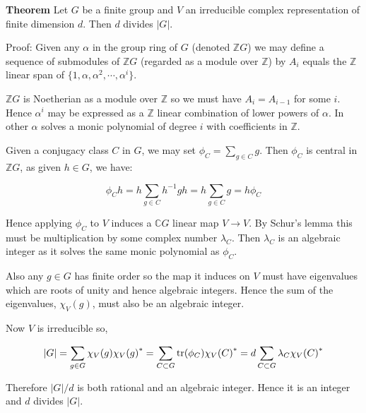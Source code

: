 \documentclass[12pt]{article}
\begin{document}
{\bf Theorem} Let $G$ be a finite group and $V$ an irreducible
complex representation of finite dimension $d$. Then $d$ divides
$|G|$.

Proof: Given any $\alpha$ in the group ring of $G$ (denoted
$\mathbb{Z}G$) we may define a sequence of submodules of
$\mathbb{Z}G$ (regarded as a module over $\mathbb{Z}$)
by $A_i$ equals the $\mathbb{Z}$ linear span of
$\{1,\alpha, \alpha^2, \cdots, \alpha^i\}$.

$\mathbb{Z}G$ is Noetherian as a module over $\mathbb{Z}$ so we
must have $A_i =A_{i-1}$ for some $i$.  Hence $\alpha^i$ may be
expressed as a $\mathbb{Z}$ linear combination of lower powers of
$\alpha$. In other  $\alpha$ solves a monic polynomial of
degree $i$ with coefficients in $\mathbb{Z}$.

Given a conjugacy class $C$ in $G$, we may set $\phi_C = \sum_{g
\in C} g$.  Then $\phi_C$ is central in $\mathbb{Z}G$, as given $h
\in G$, we have:

$$\phi_C h =h\sum_{g \in C} h^{-1}gh = h\sum_{g \in C} g=h\phi_C$$

Hence applying $\phi_C$ to $V$ induces a $\mathbb{C}G$ linear map
$V \to V$.  By Schur's lemma this must be 
multiplication by some
complex number $\lambda_C$.  Then $\lambda_C$ is an algebraic
integer as it solves the same monic polynomial as $\phi_C$.

Also any $g \in G$ has finite order so the map it induces on $V$
must have eigenvalues which are roots of unity and hence algebraic
integers.  Hence the sum of the eigenvalues, $\chi_V (g)$, must
also be an algebraic integer.

Now $V$ is irreducible so,

$$
|G|= \sum_{g \in G} \chi_V(g) {\chi_V(g)}^* = \sum_{C \subset G}
{\rm tr}(\phi_C){\chi_V(C)}^* = d\sum_{C \subset  G} \lambda_C
{\chi_V(C)}^*
$$

Therefore $|G|/d$ is both rational and an algebraic integer. Hence
it is an integer and $d$ divides $|G|$.

\end{document}

